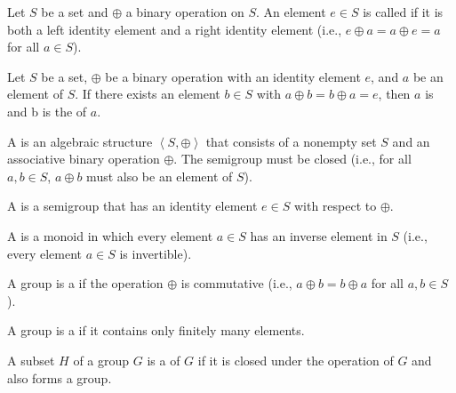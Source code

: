 \begin{defi} Let $S$ be a set and $\oplus$ a binary operation on $S$. An element $e\in S$ is called  if it is both a left identity element and a right identity element (i.e., $e\oplus a = a\oplus e = a$ for all $a\in S$).
\cite{Oppliger:2011:CC:2049860}
\end{defi}

\begin{defi} Let $S$ be a set, $\oplus$ be a binary operation with an identity element $e$, and $a$ be an element of $S$. If there exists an element $b\in S$ with $a\oplus b = b\oplus a = e$, then $a$ is  and b is the  of $a$.
\cite{Oppliger:2011:CC:2049860}
\end{defi}

\begin{defi}[Semigroup]
A  is an algebraic structure $\left\langle S,\oplus\right\rangle$ that consists of a nonempty set $S$ and an associative binary operation $\oplus$. The semigroup must be closed (i.e., for all $a,b\in S$, $a\oplus b$ must also be an element of $S$).
\cite{Oppliger:2011:CC:2049860}
\end{defi}

\begin{defi}[Monoid]
A  is a semigroup \soplus that has an identity element $e\in S$ with respect to $\oplus$.
\cite{Oppliger:2011:CC:2049860}
\end{defi}

\begin{defi}[Group]
A  is a monoid \soplus in which every element $a\in S$ has an inverse element in $S$ (i.e., every element $a\in S$ is invertible).
\cite{Oppliger:2011:CC:2049860}
\end{defi}

\begin{defi}
A group \soplus is a  if the operation $\oplus$ is commutative (i.e., $a\oplus b = b\oplus a$ for all $a, b\in S$).
\cite{Oppliger:2011:CC:2049860}
\end{defi}

\begin{defi}
A group \soplus is a  if it contains only finitely many elements.
\cite{Oppliger:2011:CC:2049860}
\end{defi}

\begin{defi}[Subgroup]
A subset $H$ of a group $G$ is a  of $G$ if it is closed under the operation of $G$ and also forms a group.
\cite{Oppliger:2011:CC:2049860}
\end{defi}

